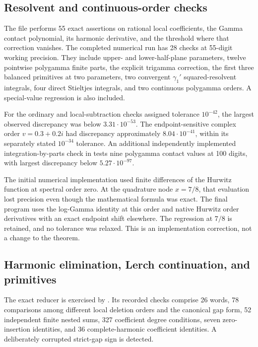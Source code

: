 \subsection{Resolvent and continuous-order checks}

The file  performs 55 exact assertions
on rational local coefficients, the Gamma contact polynomial, its
harmonic derivative, and the threshold where that correction
vanishes. The completed numerical run has 28 checks at 55-digit
working precision. They include upper- and lower-half-plane
parameters, twelve pointwise polygamma finite parts, the explicit
trigamma correction, the first three balanced primitives at two
parameters, two convergent $\gamma_1'$ squared-resolvent integrals,
four direct Stieltjes integrals, and two continuous polygamma orders.
A special-value regression is also included.

For the ordinary and local-subtraction checks assigned tolerance
$10^{-42}$, the largest observed discrepancy was below
$3.31\cdot10^{-53}$. The endpoint-sensitive complex order
$v=0.3+0.2i$ had discrepancy approximately $8.04\cdot10^{-41}$,
within its separately stated $10^{-34}$ tolerance.
An additional independently implemented integration-by-parts
check in  tests nine
polygamma contact values at 100 digits, with largest discrepancy
below $5.27\cdot10^{-97}$.

The initial numerical implementation used finite differences of
the Hurwitz function at spectral order zero. At the quadrature
node $x=7/8$, that evaluation lost precision even though the
mathematical formula was exact. The final program uses the
log-Gamma identity at this order and native Hurwitz order
derivatives with an exact endpoint shift elsewhere. The regression
at $7/8$ is retained, and no tolerance was relaxed. This is an
implementation correction, not a change to the theorem.

\subsection{Harmonic elimination, Lerch continuation, and primitives}

The exact reducer  is exercised by
. Its recorded checks comprise
26 words, 78 comparisons among different local deletion orders
and the canonical gap form, 52 independent finite nested sums,
327 coefficient degree conditions, seven zero-insertion
identities, and 36 complete-harmonic coefficient identities.
A deliberately corrupted strict-gap sign is detected.


